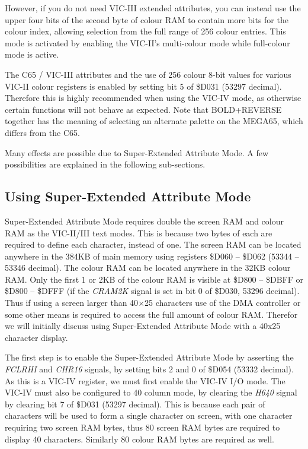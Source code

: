 However, if you do not need VIC-III extended attributes, you can instead use the upper four bits of the second byte of colour RAM to contain more bits for the colour index, allowing selection from the full range of 256 colour entries.  This mode is activated by enabling the VIC-II's multi-colour mode while full-colour mode is active.

The C65 / VIC-III attributes and the use of 256 colour 8-bit values for various VIC-II colour registers is enabled by setting bit 5 of \$D031 (53297 decimal).  Therefore this is highly recommended when using the VIC-IV mode, as otherwise certain functions will not behave as expected. Note that BOLD+REVERSE together has the meaning of selecting an alternate palette on the MEGA65, which differs from the C65.

Many effects are possible due to Super-Extended Attribute Mode.  A few possibilities are explained in the following sub-sections.

\subsection{Using Super-Extended Attribute Mode}

Super-Extended Attribute Mode requires double the screen RAM and colour RAM as the VIC-II/III text modes. This is because two bytes of each are required to define each character, instead of one.  The screen RAM can be located anywhere in the 384KB of main memory using registers \$D060 -- \$D062 (53344 -- 53346 decimal).  The colour RAM can be located anywhere in the 32KB colour RAM.  Only the first 1 or 2KB of the colour RAM is visible at \$D800 -- \$DBFF or \$D800 -- \$DFFF (if the {\em CRAM2K} signal is set in bit 0 of \$D030, 53296 decimal).  Thus if using a screen larger than 40$\times$25 characters use of the DMA controller or some other means is required to access the full amount of colour RAM.  Therefor we will initially discuss using Super-Extended Attribute Mode with a 40x25 character display.

The first step is to enable the Super-Extended Attribute Mode by asserting the {\em FCLRHI} and {\em CHR16} signals, by setting bits 2 and 0 of \$D054 (53332 decimal).  As this is a VIC-IV register, we must first enable the VIC-IV I/O mode.  The VIC-IV must also be configured to 40 column mode, by clearing the {\em H640} signal by clearing bit 7 of \$D031 (53297 decimal).  This is because each pair of characters will be used to form a single character on screen, with one character requiring two screen RAM bytes, thus 80 screen RAM bytes are required to display 40 characters.  Similarly 80 colour RAM bytes are required as well.

